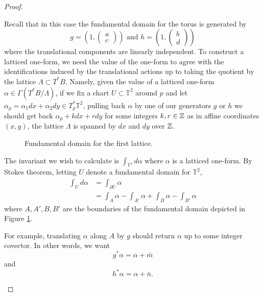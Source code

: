 \begin{proof}
    \begin{case}[$\mathcal{A}_{a,b,c,d}$]
        Recall that in this case the fundamental domain for the torus is generated by
        $$g = \left( 1, \begin{pmatrix}
                    a \\ c
                \end{pmatrix} \right) \text{ and } h=\left( 1, \begin{pmatrix}
                    b \\ d
                \end{pmatrix} \right)$$
        where the translational components are linearly independent. To construct a latticed one-form,
        we need the value of the one-form to agree with the identifications induced by the translational
        actions up to taking the quotient by the lattice $\Lambda \subset T^*B$. Namely, given the value
        of a latticed one-form $\alpha \in \Gamma(T^*B/\Lambda)$, if we fix a chart $U\subset \mathbb{T}^2$
        around $p$ and let $\alpha_p = \alpha_1dx + \alpha_2 dy \in T_p^*\mathbb{T}^2$, pulling back $\alpha$ by one
        of our generators $g$ or $h$ we should get back $\alpha_p + kdx + rdy$ for some integers $k,r \in \mathbb{Z}$
        as in affine coordinates $(x,y)$, the lattice $\Lambda$ is spanned by $dx$ and $dy$ over $\mathbb{Z}$.

        \begin{figure}[H]
            \centering
            \caption{Fundamental domain for the first lattice.}
            \label{fig:first-lattice}
        \end{figure}

        The invariant we wish to calculate is $\int_{\mathbb{T}^2} d\alpha$ where
        $\alpha$ is a latticed one-form. By Stokes theorem, letting $U$ denote a
        fundamental domain for $\mathbb{T}^2$,
        \begin{align*}
            \int_{U} d\alpha & = \int_{\partial U} \alpha                                           \\
                             & = \int_A \alpha - \int_{A'}\alpha + \int_B \alpha - \int_{B'} \alpha
        \end{align*}
        where $A,A',B,B'$ are the boundaries of the fundamental domain depicted in Figure \ref{fig:first-lattice}.

        For example, translating $\alpha$ along $A$ by $g$ should return $\alpha$ up to
        some integer covector. In other words, we want $$ g^*\alpha = \alpha + \bar{m}
        $$ and $$ h^* \alpha = \alpha + \bar{n}. $$


\end{case}
\end{proof}
